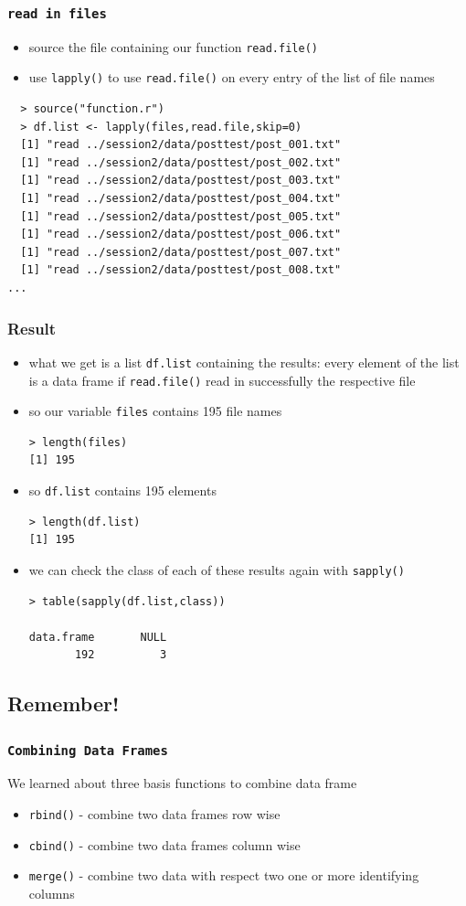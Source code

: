 \documentclass[xcolor={table},c]{beamer}
\begin{document}
\begin{frame}[fragile]\frametitle{\texttt{read in files}}
  \begin{itemize}
  \item source the file containing our function \texttt{read.file()}
  \item use \texttt{lapply()} to use \texttt{read.file()} on every entry of the list of file names
  \end{itemize}
\begin{verbatim}
  > source("function.r")
  > df.list <- lapply(files,read.file,skip=0)
  [1] "read ../session2/data/posttest/post_001.txt"
  [1] "read ../session2/data/posttest/post_002.txt"
  [1] "read ../session2/data/posttest/post_003.txt"
  [1] "read ../session2/data/posttest/post_004.txt"
  [1] "read ../session2/data/posttest/post_005.txt"
  [1] "read ../session2/data/posttest/post_006.txt"
  [1] "read ../session2/data/posttest/post_007.txt"
  [1] "read ../session2/data/posttest/post_008.txt"
...
\end{verbatim}
\end{frame}


\begin{frame}[fragile]\frametitle{Result}
\begin{itemize}
\item what we get is a list \texttt{df.list} containing the results: every element of the list is a data frame if \texttt{read.file()} read in successfully the respective file
\item so our variable \texttt{files} contains 195 file names
\begin{verbatim}
> length(files)
[1] 195  
\end{verbatim}
\item so \texttt{df.list} contains 195 elements
\begin{verbatim}
> length(df.list)
[1] 195  
\end{verbatim}
\item we can check the class of each of these results again with \texttt{sapply()}
\begin{verbatim}
> table(sapply(df.list,class))

data.frame       NULL 
       192          3   
\end{verbatim}
\end{itemize}
\end{frame}


\subsection{Remember!}
\begin{frame}[fragile]\frametitle{\texttt{Combining Data Frames}}
We learned about three basis functions to combine data frame
\begin{itemize}
\item \texttt{rbind()} - combine two data frames row wise
\item \texttt{cbind()} - combine two data frames column wise
\item \texttt{merge()} - combine two data with respect two one or more identifying columns
\end{itemize}
\end{frame}
\end{document}
